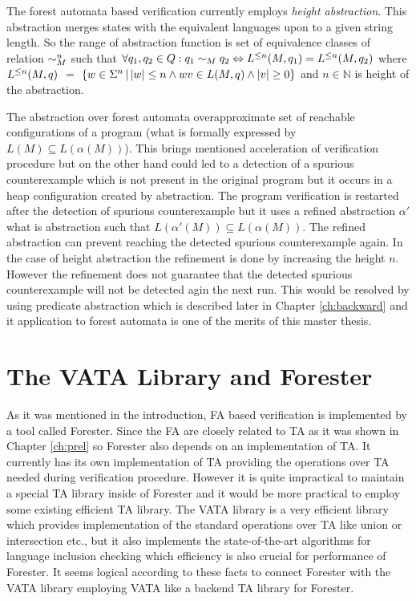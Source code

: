 The forest automata based verification currently employs \emph{height abstraction}.
This abstraction merges states with the equivalent languages upon to a given string length.
So the range of abstraction function is set of equivalence classes of relation $\sim^n_M$
such that $\forall q_1,q_2 \in Q: q_1 \sim_M q_2 \Leftrightarrow L^{\leq n}(M,q_1) = L^{\leq n}(M,q_2)$ where
$L^{\leq n}(M,q)$ $=$ $\{ w \in \Sigma^n \,|\, |w| \leq n \wedge wv \in L(M,q) \wedge |v| \geq 0\}$
and $n\in \mathbb{N}$ is height of the abstraction.

The abstraction over forest automata overapproximate set of reachable
configurations of a program (what is formally expressed by $L(M) \subseteq L(\alpha(M))$).
This brings mentioned acceleration of verification procedure but on the other hand
could led to a detection of a spurious counterexample which is not present
in the original program but it occurs in a heap configuration created by abstraction.
The program verification is restarted after the detection of spurious counterexample
but it uses a refined abstraction $\alpha'$ what is abstraction such that $L(\alpha'(M)) \subseteq L(\alpha(M))$.
The refined abstraction can prevent reaching the detected spurious counterexample again.
In the case of height abstraction the refinement is done by increasing the height $n$.
However the refinement does not guarantee that the detected spurious counterexample will not
be detected agin the next run.
This would be resolved by using predicate abstraction which is described later in Chapter \ref{ch:backward}
and it application to forest automata is one of the merits of this master thesis.

\chapter{The VATA Library and Forester}
\label{ch:tools}

As it was mentioned in the introduction, FA based verification is implemented by a tool
called Forester.
Since the FA are closely related to TA as it was shown in Chapter \ref{ch:prel} so
Forester also depends on an implementation of TA.
It currently has its own implementation of TA providing the operations over TA needed during verification procedure.
However it is quite impractical to maintain a special TA library inside of Forester
and it would be more practical to employ some existing efficient TA library.
The VATA library is a very efficient library which provides implementation of the standard operations over TA like union or intersection etc.,
but it also implements the state-of-the-art algorithms \cite{tacas10} for language inclusion checking which efficiency
is also crucial for performance of Forester.
It seems logical according to these facts to connect Forester with the VATA library employing VATA like a backend TA library for Forester.

